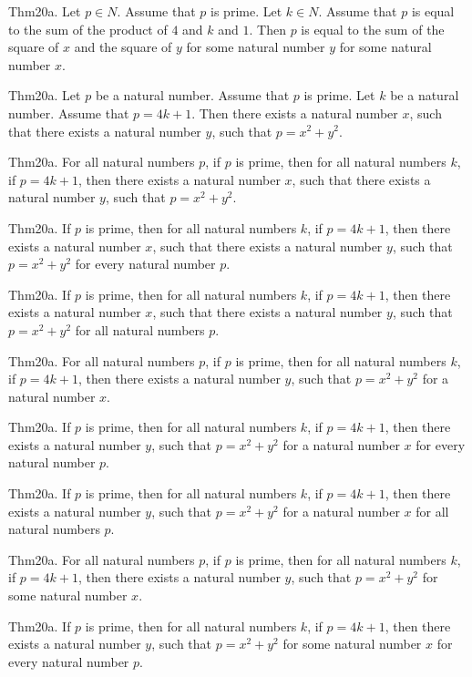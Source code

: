 \documentclass{article}
\begin{document}
Thm20a. Let $p \in N$. Assume that $p$ is prime. Let $k \in N$. Assume that $p$ is equal to the sum of the product of $4$ and $k$ and $1$. Then $p$ is equal to the sum of the square of $x$ and the square of $y$ for some natural number $y$ for some natural number $x$.

Thm20a. Let $p$ be a natural number. Assume that $p$ is prime. Let $k$ be a natural number. Assume that $p = 4 k + 1$. Then there exists a natural number $x$, such that there exists a natural number $y$, such that $p = x ^{ 2}+ y ^{ 2}$.

Thm20a. For all natural numbers $p$, if $p$ is prime, then for all natural numbers $k$, if $p = 4 k + 1$, then there exists a natural number $x$, such that there exists a natural number $y$, such that $p = x ^{ 2}+ y ^{ 2}$.

Thm20a. If $p$ is prime, then for all natural numbers $k$, if $p = 4 k + 1$, then there exists a natural number $x$, such that there exists a natural number $y$, such that $p = x ^{ 2}+ y ^{ 2}$ for every natural number $p$.

Thm20a. If $p$ is prime, then for all natural numbers $k$, if $p = 4 k + 1$, then there exists a natural number $x$, such that there exists a natural number $y$, such that $p = x ^{ 2}+ y ^{ 2}$ for all natural numbers $p$.

Thm20a. For all natural numbers $p$, if $p$ is prime, then for all natural numbers $k$, if $p = 4 k + 1$, then there exists a natural number $y$, such that $p = x ^{ 2}+ y ^{ 2}$ for a natural number $x$.

Thm20a. If $p$ is prime, then for all natural numbers $k$, if $p = 4 k + 1$, then there exists a natural number $y$, such that $p = x ^{ 2}+ y ^{ 2}$ for a natural number $x$ for every natural number $p$.

Thm20a. If $p$ is prime, then for all natural numbers $k$, if $p = 4 k + 1$, then there exists a natural number $y$, such that $p = x ^{ 2}+ y ^{ 2}$ for a natural number $x$ for all natural numbers $p$.

Thm20a. For all natural numbers $p$, if $p$ is prime, then for all natural numbers $k$, if $p = 4 k + 1$, then there exists a natural number $y$, such that $p = x ^{ 2}+ y ^{ 2}$ for some natural number $x$.

Thm20a. If $p$ is prime, then for all natural numbers $k$, if $p = 4 k + 1$, then there exists a natural number $y$, such that $p = x ^{ 2}+ y ^{ 2}$ for some natural number $x$ for every natural number $p$.
\end{document}
